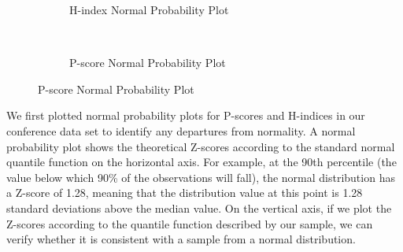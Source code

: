 \documentclass[notitlepage]{svjour3}
\begin{document}
\begin{figure}[h]
\centering
  \begin{subfigure}{.475\linewidth}
  \centering
 
    \caption{H-index Normal Probability Plot}
    \label{fig:hindex_normality}
  \end{subfigure}
  ~
  \begin{subfigure}{.475\linewidth}
    \caption{P-score Normal Probability Plot}
    \label{fig:pscore_normality}
  \end{subfigure}
\end{figure}

We first plotted normal probability plots for P-scores and H-indices in our conference data set 
to identify any departures from normality. A normal probability plot shows the theoretical Z-scores
according to the standard normal quantile function on the horizontal axis. For example, at the 90th
percentile (the value below which 90\% of the observations will fall), the normal distribution has a
Z-score of 1.28, meaning that the distribution value at this point is 1.28 standard deviations above the median value. On the vertical axis, if
we plot the Z-scores according to the quantile function described by our sample, we can verify
whether it is consistent with a sample from a normal distribution.
\end{document}
